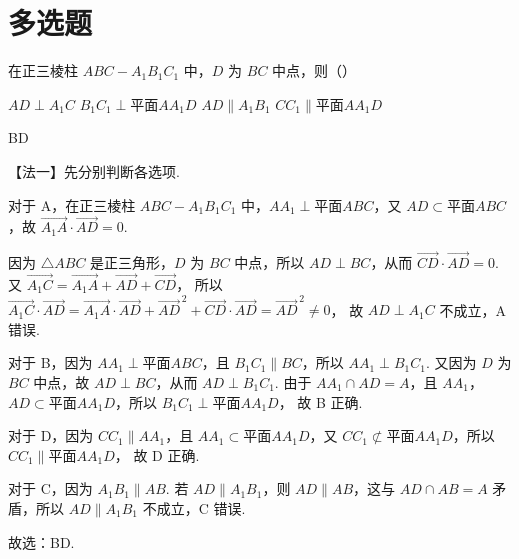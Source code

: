 \section{多选题}

\begin{problem}
在正三棱柱 \(ABC - A_1B_1C_1\) 中，\(D\) 为 \(BC\) 中点，则（\quad）

\choices
    {\(AD \perp A_1C\)}
    {\(B_1C_1 \perp \text{平面} AA_1D\)}
    {\(AD \parallel A_1B_1\)}
    {\(CC_1 \parallel \text{平面} AA_1D\)}
\end{problem}

\begin{answer}
BD
\end{answer}

\begin{solution}
【法一】先分别判断各选项.

对于 A，在正三棱柱 \(ABC - A_1B_1C_1\) 中，\(AA_1 \perp \text{平面} ABC\)，又 \(AD \subset \text{平面} ABC\)，故
\(\overrightarrow{A_1A} \cdot \overrightarrow{AD} = 0\).


因为 \(\triangle ABC\) 是正三角形，\(D\) 为 \(BC\) 中点，所以 \(AD \perp BC\)，从而
\(\overrightarrow{CD} \cdot \overrightarrow{AD} = 0\).
又
\(\overrightarrow{A_1C} = \overrightarrow{A_1A} + \overrightarrow{AD} + \overrightarrow{CD}\)，
所以
\(
\overrightarrow{A_1C} \cdot \overrightarrow{AD}
= \overrightarrow{A_1A} \cdot \overrightarrow{AD} + \overrightarrow{AD}^{\,2} + \overrightarrow{CD} \cdot \overrightarrow{AD}
= \overrightarrow{AD}^{\,2} \neq 0
\)，
故 \(AD \perp A_1C\) 不成立，A 错误.

对于 B，因为 \(AA_1 \perp \text{平面} ABC\)，且 \(B_1C_1 \parallel BC\)，所以 \(AA_1 \perp B_1C_1\).
又因为 \(D\) 为 \(BC\) 中点，故 \(AD \perp BC\)，从而 \(AD \perp B_1C_1\).
由于 \(AA_1 \cap AD = A\)，且 \(AA_1\)，\(AD \subset \text{平面} AA_1D\)，所以
\(B_1C_1 \perp \text{平面} AA_1D\)，
故 B 正确.

对于 D，因为 \(CC_1 \parallel AA_1\)，且 \(AA_1 \subset \text{平面} AA_1D\)，又 \(CC_1 \not\subset \text{平面} AA_1D\)，所以
\(CC_1 \parallel \text{平面} AA_1D\)，
故 D 正确.

对于 C，因为 \(A_1B_1 \parallel AB\). 若 \(AD \parallel A_1B_1\)，则 \(AD \parallel AB\)，这与 \(AD \cap AB = A\) 矛盾，所以 \(AD \parallel A_1B_1\) 不成立，C 错误.

故选：BD.


\end{solution}
